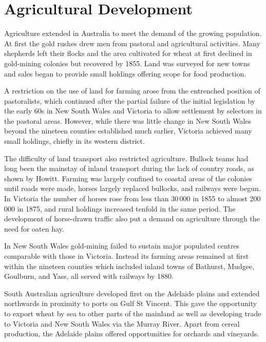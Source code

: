 \section*{Agricultural Development}

Agriculture extended in Australia to meet the demand of the growing
population.  At first the gold rushes drew men from pastoral and
agricultural activities.  Many shepherds left their flocks and the
area cultivated for wheat at first declined in gold-mining colonies
but recovered by 1855.  Land was surveyed for new towns and sales
began to provide small holdings offering scope for food production.

A restriction on the use of land for farming arose from the entrenched
position of pastoralists, which continued after the partial failure of
the initial legislation by the early 60s in New South Wales and
Victoria to allow settlement by selectors in the pastoral areas.
However, while there was little change in New South Wales beyond the
nineteen counties established much earlier, Victoria achieved many
small holdings, chiefly in its western
district.

The difficulty of land transport also restricted agriculture.  Bullock
teams had long been the mainstay of inland transport during the lack
of country roads, as shown by Howitt.  Farming was largely confined to
coastal areas of the colonies until roads were made, horses largely
replaced bullocks, and railways were begun.  In Victoria the number of
horses rose from less than 30\,000 in 1855 to almost 200\,000 in 1875,
and rural holdings increased tenfold in the same period.  The
development of horse-drawn traffic also put a demand on agriculture
through the need for oaten hay.

In New South Wales gold-mining failed to sustain major populated
centres comparable with those in Victoria.  Instead its farming areas
remained at first within the nineteen counties which included inland
towns of Bathurst, Mudgee, Goulburn, and Yass, all served with
railways by 1880.

South Australian agriculture developed first on the Adelaide plains
and extended northwards in proximity to ports on Gulf St Vincent.
This gave the opportunity to export wheat by sea to other parts of the
mainland as well as developing trade to Victoria and New South Wales
via the Murray River.  Apart from cereal production, the Adelaide
plains offered opportunities for orchards and vineyards.

